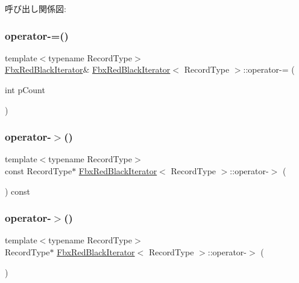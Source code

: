 呼び出し関係図\+:
\mbox{\label{class_fbx_red_black_iterator_ab659f3099189e3b8f9b3c1dd12c7b6bd}} 
\subsubsection{\texorpdfstring{operator-\/=()}{operator-=()}}
{\footnotesize\ttfamily template$<$typename Record\+Type$>$ \\
\hyperlink{class_fbx_red_black_iterator}{Fbx\+Red\+Black\+Iterator}\& \hyperlink{class_fbx_red_black_iterator}{Fbx\+Red\+Black\+Iterator}$<$ Record\+Type $>$\+::operator-\/= (\begin{DoxyParamCaption}\item[{int}]{p\+Count }\end{DoxyParamCaption})}

\mbox{\label{class_fbx_red_black_iterator_a119327d8f6cad282780ad35bc45da243}} 
\subsubsection{\texorpdfstring{operator-\/$>$()}{operator->()}\hspace{0.1cm}{\footnotesize\ttfamily [1/2]}}
{\footnotesize\ttfamily template$<$typename Record\+Type$>$ \\
const Record\+Type$\ast$ \hyperlink{class_fbx_red_black_iterator}{Fbx\+Red\+Black\+Iterator}$<$ Record\+Type $>$\+::operator-\/$>$ (\begin{DoxyParamCaption}{ }\end{DoxyParamCaption}) const}

\mbox{\label{class_fbx_red_black_iterator_a562051f415cb531defaedac5831720c5}} 
\subsubsection{\texorpdfstring{operator-\/$>$()}{operator->()}\hspace{0.1cm}{\footnotesize\ttfamily [2/2]}}
{\footnotesize\ttfamily template$<$typename Record\+Type$>$ \\
Record\+Type$\ast$ \hyperlink{class_fbx_red_black_iterator}{Fbx\+Red\+Black\+Iterator}$<$ Record\+Type $>$\+::operator-\/$>$ (\begin{DoxyParamCaption}{ }\end{DoxyParamCaption})}

